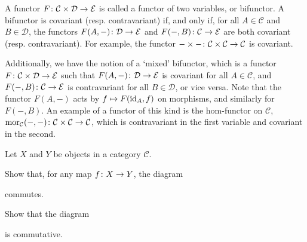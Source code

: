 A functor $F\colon\mathcal{C}\times \mathcal{D}\to\mathcal{E}$ is called a functor of two variables, or bifunctor. A bifunctor is covariant (resp. contravariant) if, and only if, for all $A\in\mathcal{C}$ and $B\in\mathcal{D}$, the functors $F(A,-)\colon \mathcal{D}\to \mathcal{E}$ and $F(-,B)\colon \mathcal{C}\to \mathcal{E}$ are both covariant (resp. contravariant). For example, the functor $-\times -\colon \mathcal{C}\times \mathcal{C}\to\mathcal{C}$ is covariant.

Additionally, we have the notion of a `mixed' bifunctor, which is a functor $F\colon\mathcal{C}\times \mathcal{D}\to\mathcal{E}$ such that $F(A,-)\colon \mathcal{D}\to \mathcal{E}$ is covariant for all $A\in\mathcal{C}$, and $F(-,B)\colon \mathcal{C}\to \mathcal{E}$ is contravariant for all $B\in\mathcal{D}$, or vice versa. Note that the functor $F(A,-)$ acts by $f\mapsto F(\mathrm{id}_A,f)$ on morphisms, and similarly for $F(-,B)$. An example of a functor of this kind is the hom-functor on $\mathcal{C}$, $\operatorname{mor}_{\mathcal{C}}(-,-) \colon \mathcal{C} \times \mathcal{C} \to \mathcal{C}$, which is contravariant in the first variable and covariant in the second.
\es

\bp
Let $X$ and $Y$ be objects in a category $\mathcal{C}$.
\ben[label=(\alph*)]
\item Show that, for any map $f\colon X \to Y$, the diagram
\bse
{}
\ese
commutes.
\item Show that the diagram
\bse
{}
\ese
is commutative.
\een
\ep

